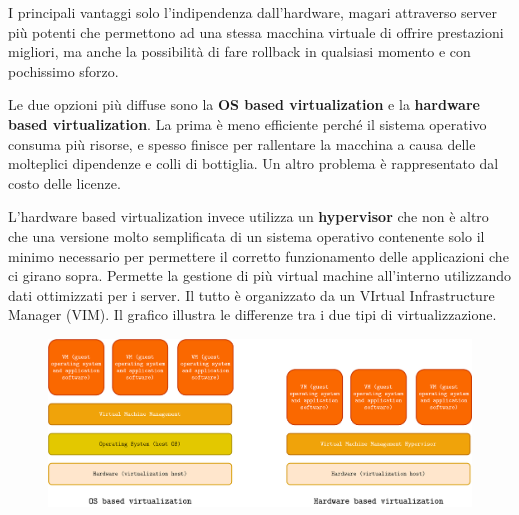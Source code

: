 I principali vantaggi solo l'indipendenza dall'hardware, magari attraverso server più potenti che permettono ad una stessa macchina virtuale di offrire prestazioni migliori, ma anche la possibilità di fare rollback in qualsiasi momento e con pochissimo sforzo.

Le due opzioni più diffuse sono la \textbf{OS based virtualization} e la \textbf{hardware based virtualization}. La prima è meno efficiente perché il sistema operativo consuma più risorse, e spesso finisce per rallentare la macchina a causa delle molteplici dipendenze e colli di bottiglia. Un altro problema è rappresentato dal costo delle licenze.

L'hardware based virtualization invece utilizza un \textbf{hypervisor} che non è altro che una versione molto semplificata di un sistema operativo contenente solo il minimo necessario per permettere il corretto funzionamento delle applicazioni che ci girano sopra. Permette la gestione di più virtual machine all'interno utilizzando dati ottimizzati per i server. Il tutto è organizzato da un VIrtual Infrastructure Manager (VIM). Il grafico illustra le differenze tra i due tipi di virtualizzazione.

\begin{figure}[ht]
    \centering
    \includegraphics[width=12cm]{./Images/cap3/3.10.png}
\end{figure}

